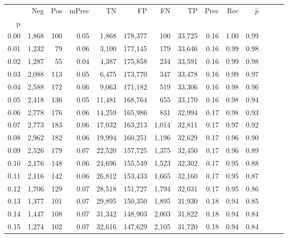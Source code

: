 \begin{tabular}{rrrrrrrrrrrrrr}
\toprule
{} &    Neg &  Pos & mPrec &       TN &       FP &      FN &      TP &  Prec &   Rec & $\hat{p}$ \\
p    &        &      &       &          &          &         &         &       &       &           \\
\midrule
0.00 &  1,868 &  100 &  0.05 &    1,868 &  178,377 &     100 &  33,725 &  0.16 &  1.00 &      0.99 \\
0.01 &  1,232 &   79 &  0.06 &    3,100 &  177,145 &     179 &  33,646 &  0.16 &  0.99 &      0.98 \\
0.02 &  1,287 &   55 &  0.04 &    4,387 &  175,858 &     234 &  33,591 &  0.16 &  0.99 &      0.98 \\
0.03 &  2,088 &  113 &  0.05 &    6,475 &  173,770 &     347 &  33,478 &  0.16 &  0.99 &      0.97 \\
0.04 &  2,588 &  172 &  0.06 &    9,063 &  171,182 &     519 &  33,306 &  0.16 &  0.98 &      0.96 \\
0.05 &  2,418 &  136 &  0.05 &   11,481 &  168,764 &     655 &  33,170 &  0.16 &  0.98 &      0.94 \\
0.06 &  2,778 &  176 &  0.06 &   14,259 &  165,986 &     831 &  32,994 &  0.17 &  0.98 &      0.93 \\
0.07 &  2,773 &  183 &  0.06 &   17,032 &  163,213 &   1,014 &  32,811 &  0.17 &  0.97 &      0.92 \\
0.08 &  2,962 &  182 &  0.06 &   19,994 &  160,251 &   1,196 &  32,629 &  0.17 &  0.96 &      0.90 \\
0.09 &  2,526 &  179 &  0.07 &   22,520 &  157,725 &   1,375 &  32,450 &  0.17 &  0.96 &      0.89 \\
0.10 &  2,176 &  148 &  0.06 &   24,696 &  155,549 &   1,523 &  32,302 &  0.17 &  0.95 &      0.88 \\
0.11 &  2,116 &  142 &  0.06 &   26,812 &  153,433 &   1,665 &  32,160 &  0.17 &  0.95 &      0.87 \\
0.12 &  1,706 &  129 &  0.07 &   28,518 &  151,727 &   1,794 &  32,031 &  0.17 &  0.95 &      0.86 \\
0.13 &  1,377 &  101 &  0.07 &   29,895 &  150,350 &   1,895 &  31,930 &  0.18 &  0.94 &      0.85 \\
0.14 &  1,447 &  108 &  0.07 &   31,342 &  148,903 &   2,003 &  31,822 &  0.18 &  0.94 &      0.84 \\
0.15 &  1,274 &  102 &  0.07 &   32,616 &  147,629 &   2,105 &  31,720 &  0.18 &  0.94 &      0.84 \\

\end{tabular}
